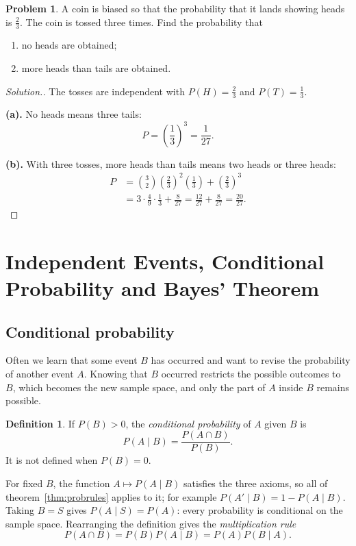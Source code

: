 \documentclass[12pt,a4paper]{report}
\theoremstyle{definition}
\newtheorem{definition}[thm]{Definition}
\theoremstyle{plain}
\theoremstyle{definition}
\newtheorem{problemx}{Problem}[section]
\newenvironment{problem}{\begin{problemx}}{\end{problemx}}
\newenvironment{solution}
  {\renewcommand{\qedsymbol}{}\begin{proof}[\textit{Solution}.]}
  {\end{proof}}
\begin{document}
\begin{problem}
A coin is biased so that the probability that it lands showing heads is $\frac{2}{3}$.
The coin is tossed three times. Find the probability that
\begin{enumerate}
\item[(a).] no heads are obtained;
\item[(b).] more heads than tails are obtained.
\end{enumerate}
\end{problem}

\begin{solution}
The tosses are independent with $P(H)=\tfrac23$ and $P(T)=\tfrac13$.

\textbf{(a).} No heads means three tails:
\[P = \left(\frac{1}{3}\right)^{3} = \frac{1}{27}.\]

\textbf{(b).} With three tosses, more heads than tails means two heads or three heads:
\begin{align*}
P &= \binom{3}{2}\left(\frac{2}{3}\right)^{2}\left(\frac{1}{3}\right) + \left(\frac{2}{3}\right)^{3}\\
  &= 3\cdot\frac{4}{9}\cdot\frac{1}{3} + \frac{8}{27}
   = \frac{12}{27}+\frac{8}{27} = \frac{20}{27}.
\end{align*}
\end{solution}

\section{Independent Events, Conditional Probability and Bayes' Theorem}
\label{sec:conditional}

\subsection{Conditional probability}

Often we learn that some event $B$ has occurred and want to revise the probability of
another event $A$. Knowing that $B$ occurred restricts the possible outcomes to $B$,
which becomes the new sample space, and only the part of $A$ inside $B$ remains
possible.

\begin{definition}
\label{def:conditional}
If $P(B)>0$, the \emph{conditional probability} of $A$ given $B$ is
\[P(A\mid B) = \frac{P(A\cap B)}{P(B)} .\]
It is not defined when $P(B) = 0$.
\end{definition}

For fixed $B$, the function $A\mapsto P(A\mid B)$ satisfies the three axioms, so all of
theorem~\ref{thm:probrules} applies to it; for example $P(A'\mid B) = 1 - P(A\mid B)$.
Taking $B = S$ gives $P(A\mid S) = P(A)$: every probability is conditional on the
sample space. Rearranging the definition gives the \emph{multiplication rule}
\begin{equation}
\label{eq:multrule}
P(A\cap B) = P(B)P(A\mid B) = P(A)P(B\mid A).
\end{equation}
\end{document}
